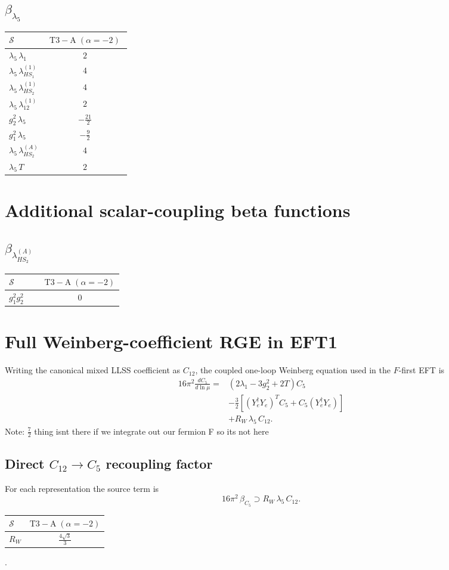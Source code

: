 \documentclass[9pt]{article}
\begin{document}
\subsection*{$ \beta_{\lambda_5} $}
\begin{longtable}{@{}p{0.31\linewidth}c@{}}
\toprule
$\mathcal{S}$ & $ \mathrm{T3-A}\;(\alpha=-2) $ \\
\midrule
$ \lambda_5\,\lambda_1 $ & $ 2 $ \\
$ \lambda_5\,\lambda_{HS_1}^{(1)} $ & $ 4 $ \\
$ \lambda_5\,\lambda_{HS_2}^{(1)} $ & $ 4 $ \\
$ \lambda_5\,\lambda_{12}^{(1)} $ & $ 2 $ \\
$ g_2^2\,\lambda_5 $ & $ - \frac{21}{2} $ \\
$ g_1^2\,\lambda_5 $ & $ - \frac{9}{2} $ \\
$ \lambda_5\,\lambda_{HS_2}^{(A)} $ & $ 4 $ \\
$ \lambda_5\,T $ & $ 2 $ \\
\bottomrule
\end{longtable}
\section*{Additional scalar-coupling beta functions}
\subsection*{$ \beta_{\lambda_{HS_2}^{(A)}} $}
\begin{longtable}{@{}p{0.31\linewidth}c@{}}
\toprule
$\mathcal{S}$ & $ \mathrm{T3-A}\;(\alpha=-2) $ \\
\midrule
$ g_1^2g_2^2 $ & $ 0 $ \\
\bottomrule
\end{longtable}

\section*{Full Weinberg-coefficient RGE in EFT1}
Writing the canonical mixed LLSS coefficient as $C_{12}$, the coupled one-loop Weinberg equation used in the $F$-first EFT is
\begin{align}
16\pi^2\frac{dC_5}{d\ln\mu}={}&(2\lambda_1-3g_2^2+2T)C_5\\
&-\frac32\left[(Y_e^\dagger Y_e)^T C_5+C_5(Y_e^\dagger Y_e)\right]\\
&+R_W\,\lambda_5\,C_{12}.
\end{align}
Note: $\frac{7}{2}$ thing isnt there if we integrate out our fermion F so its not here \subsection*{Direct $C_{12}\to C_5$ recoupling factor}
For each representation the source term is
\[16\pi^2\,\beta_{C_5}\supset R_W\,\lambda_5\,C_{12}.\]
\begin{longtable}{@{}lc@{}}
\toprule
$\mathcal{S}$ & $ \mathrm{T3-A}\;(\alpha=-2) $ \\
\midrule
$R_W$ & $ \frac{4 \sqrt{3}}{3} $ \\
\bottomrule
\end{longtable}
.
\end{document}
